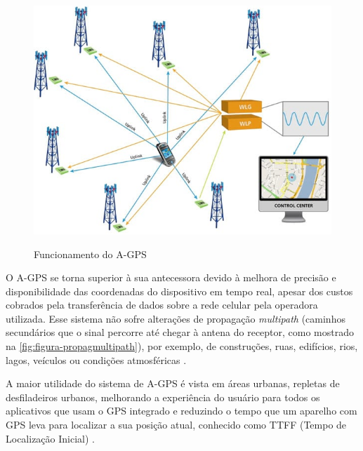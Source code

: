 \begin{figure}[H]
    \centering
    \caption{Funcionamento do A-GPS}
    \includegraphics[width=1.0\textwidth]{./dados/figuras/fig2}
    \label{fig:figura-funcagps}
\end{figure}


O A-GPS se torna superior à sua antecessora devido à melhora de precisão e disponibilidade das coordenadas do dispositivo em tempo real, apesar dos custos cobrados pela transferência de dados sobre a rede celular pela operadora utilizada. Esse sistema não sofre alterações de propagação \textit{multipath} (caminhos secundários que o sinal percorre até chegar à antena do receptor, como mostrado na \autoref{fig:figura-propagmultipath}), por exemplo, de construções, ruas, edifícios, rios, lagos, veículos ou condições atmosféricas \cite{oficinanetagps:2018} \cite{multicaminho:2004}.

 A maior utilidade do sistema de A-GPS é vista em áreas urbanas, repletas de desfiladeiros urbanos, melhorando a experiência do usuário para todos os aplicativos que usam o GPS integrado e reduzindo o tempo que um aparelho com GPS leva para localizar a sua posição atual, conhecido como TTFF (Tempo de Localização Inicial) \cite{oficinanetagps:2018}.

